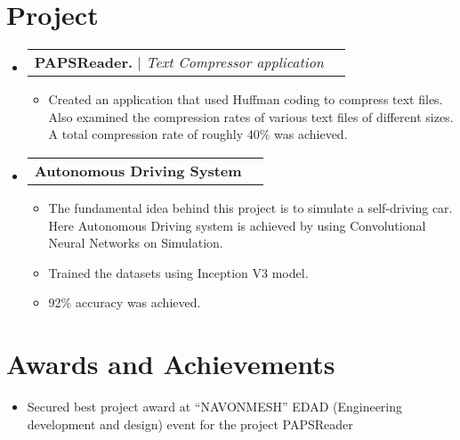 \documentclass[letterpaper,11pt]{article}
\makeatletter
\newcommand{\resumeItem}[1]{
  \item\small{
    {#1 \vspace{-2pt}}
  }
}
\newcommand{\resumeProjectHeading}[2]{
    \item
    \begin{tabular*}{0.97\textwidth}{l@{\extracolsep{\fill}}r}
      \small#1 & #2 \\
    \end{tabular*}\vspace{-7pt}
}
\newcommand{\resumeSubHeadingListStart}{\begin{itemize}[leftmargin=0.15in, label={}]}
\newcommand{\resumeSubHeadingListEnd}{\end{itemize}}
\newcommand{\resumeItemListStart}{\begin{itemize}}
\newcommand{\resumeItemListEnd}{\end{itemize}\vspace{-5pt}}
\makeatother
\begin{document}
\section{Project}
    \resumeSubHeadingListStart
      \resumeProjectHeading
          {\textbf{PAPSReader.} $|$ \emph{Text Compressor application}}{           }
          \resumeItemListStart
            \resumeItem{Created an application that used Huffman coding to compress text files. Also examined the compression rates of various text files of different sizes. A total compression rate of roughly 40\% was achieved.}
          \resumeItemListEnd
      \resumeProjectHeading
          {\textbf{Autonomous Driving System}  \emph{    }}{    }
          \resumeItemListStart
            \resumeItem{The fundamental idea behind this project is to simulate a self-driving car. Here Autonomous Driving system is achieved by using Convolutional Neural Networks on Simulation.}
            \resumeItem{Trained the datasets using Inception V3 model.}
            \resumeItem{92\% accuracy was achieved.}
          \resumeItemListEnd
    \resumeSubHeadingListEnd



%

\section{Awards and Achievements}
    \resumeItemListStart
        \resumeItem{Secured best project award at “NAVONMESH” EDAD (Engineering development and design) event for the project PAPSReader}\vspace{-4pt}
    \resumeItemListEnd
\end{document}
